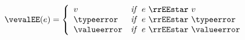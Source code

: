 {\flushleft

\begin{mathpar}


\end{mathpar}

\medskip
{}
\begin{mathpar}


\end{mathpar}

\medskip
$\vevalEE(e) = \left\{ \begin{array}{l l}
  v & \emph{if}~~e~\rrEEstar~v \\
  \typeerror & \emph{if}~~e~\rrEEstar~\typeerror \\
  \valueerror & \emph{if}~~e~\rrEEstar~\valueerror
\end{array}\right.$

}
